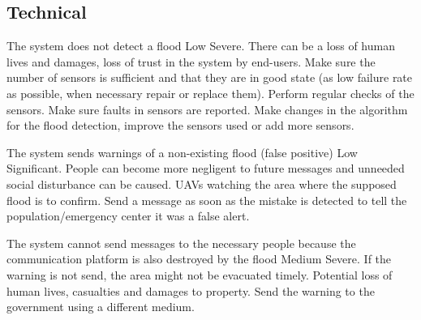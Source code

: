 

\subsection{Technical}

{The system does not detect a flood}
{Low}
{Severe. There can be a loss of human lives and damages, loss of trust in the system by end-users.}
{Make sure the number of sensors is sufficient and that they are in good state (as low failure rate as possible, when necessary repair or replace them). Perform regular checks of the sensors. Make sure faults in sensors are reported. }
{Make changes in the algorithm for the flood detection, improve the sensors used or add more sensors.}

{The system sends warnings of a non-existing flood (false positive)} %
{Low}
{Significant. People can become more negligent to future messages and unneeded social disturbance can be caused.}
{UAVs watching the area where the supposed flood is to confirm.}
{Send a message as soon as the mistake is detected to tell the population/emergency center it was a false alert. }

{The system cannot send messages to the necessary people because the communication platform is also destroyed by the flood}
{Medium}
{Severe. If the warning is not send, the area might not be evacuated timely. Potential loss of human lives, casualties and damages to property. }
{}
{Send the warning to the government using a different medium.}
	

